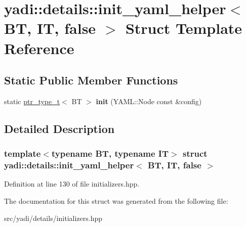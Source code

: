 \hypertarget{structyadi_1_1details_1_1init__yaml__helper_3_01_b_t_00_01_i_t_00_01false_01_4}{}\section{yadi\+:\+:details\+:\+:init\+\_\+yaml\+\_\+helper$<$ BT, IT, false $>$ Struct Template Reference}
\label{structyadi_1_1details_1_1init__yaml__helper_3_01_b_t_00_01_i_t_00_01false_01_4}
\subsection*{Static Public Member Functions}
\begin{DoxyCompactItemize}
\item 
\mbox{\label{structyadi_1_1details_1_1init__yaml__helper_3_01_b_t_00_01_i_t_00_01false_01_4_a056433bd33067957aba92754dbe1f3a2}} 
static \hyperlink{namespaceyadi_a92290eb27cd90666aa87b17d854af9fe}{ptr\+\_\+type\+\_\+t}$<$ BT $>$ {\bfseries init} (Y\+A\+M\+L\+::\+Node const \&config)
\end{DoxyCompactItemize}


\subsection{Detailed Description}
\subsubsection*{template$<$typename BT, typename IT$>$\newline
struct yadi\+::details\+::init\+\_\+yaml\+\_\+helper$<$ B\+T, I\+T, false $>$}



Definition at line 130 of file initializers.\+hpp.



The documentation for this struct was generated from the following file\+:\begin{DoxyCompactItemize}
\item 
src/yadi/details/initializers.\+hpp\end{DoxyCompactItemize}
